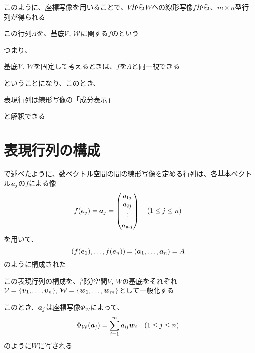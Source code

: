 \documentclass[../../../topic_linear-algebra]{subfiles}
\begin{document}
\sectionline

このように、座標写像を用いることで、$V$から$W$への線形写像$f$から、$m \times n$型行列が得られる

この行列$A$を、基底$\mathcal{V}, \, \mathcal{W}$に関する$f$のという

\br

つまり、
\begin{shaded}
  基底$\mathcal{V}, \, \mathcal{W}$を固定して考えるときは、$f$を$A$と同一視できる
\end{shaded}
ということになり、このとき、
\begin{shaded}
  表現行列は線形写像の「成分表示」
\end{shaded}
と解釈できる

\sectionline
\section{表現行列の構成}\label{sec:construction-of-matrix-rep}

で述べたように、数ベクトル空間の間の線形写像を定める行列は、各基本ベクトル$\vb*{e}_j$の$f$による像
\begin{equation*}
  f(\vb*{e}_j) = \vb*{a}_j = \begin{pmatrix}
    a_{1j} \\
    a_{2j} \\
    \vdots \\
    a_{mj}
  \end{pmatrix} \quad (1 \leq j \leq n)
\end{equation*}
を用いて、
\begin{equation*}
  \left( f(\vb*{e}_1), \ldots, f(\vb*{e}_n) \right) = \left( \vb*{a}_1, \ldots, \vb*{a}_n \right) = A
\end{equation*}
のように構成された

\br

この表現行列の構成を、部分空間$V,\,W$の基底をそれぞれ$\mathcal{V} = \{ \vb*{v}_1,\ldots, \vb*{v}_n\}, \, \mathcal{W} = \{\vb*{w}_1, \ldots, \vb*{w}_m\}$として一般化する

\br

このとき、$\vb*{a}_j$は座標写像$\Phi_{\mathcal{W}}$によって、
\begin{equation*}
  \Phi_{\mathcal{W}}(\vb*{a}_j) = \sum_{i=1}^m a_{ij} \vb*{w}_i \quad (1 \leq j \leq n)
\end{equation*}
のように$W$に写される
\end{document}
